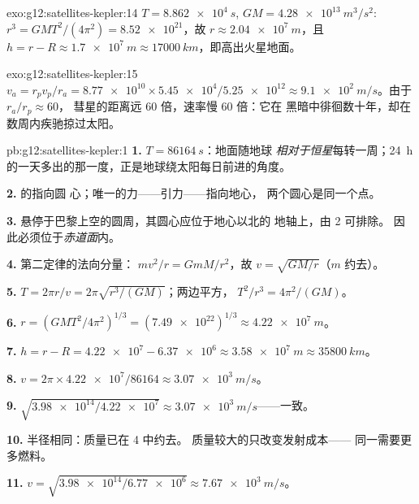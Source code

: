 \begin{solution}{exo:g12:satellites-kepler:14}
$T = \qty{8.862e4}{s}$, $GM = \qty{4.28e13}{m^3/s^2}$:
$r^3 = GMT^2/(4\pi^2) = \num{8.52e21}$，故 $r \approx
\qty{2.04e7}{m}$，且 $h = r - R \approx \qty{1.7e7}{m} \approx
\qty{17000}{km}$，即高出火星地面。
\end{solution}

\begin{solution}{exo:g12:satellites-kepler:15}
$v_a = r_p v_p / r_a = \num{8.77e10} \times \num{5.45e4} /
\num{5.25e12} \approx \qty{9.1e2}{m/s}$。由于 $r_a/r_p \approx 60$，
彗星的距离远 $60$ 倍，速率慢 $60$ 倍：它在
黑暗中徘徊数十年，却在数周内疾驰掠过太阳。
\end{solution}

\begin{solution}{pb:g12:satellites-kepler:1}
\textbf{1.} $T = \qty{86164}{s}$：地面随地球
\emph{相对于恒星}每转一周；\qty{24}{h}
的一天多出的那一度，正是地球绕太阳每日前进的角度。

\textbf{2.} 的指向圆
心；唯一的力——引力——指向地心，
两个圆心是同一个点。

\textbf{3.} 悬停于巴黎上空的圆周，其圆心应位于地心以北的
地轴上，由 2 可排除。
因此必须位于\emph{赤道面}内。

\textbf{4.} 第二定律的法向分量：
$m v^2/r = GmM/r^2$，故 $v = \sqrt{GM/r}$（$m$ 约去）。

\textbf{5.} $T = 2\pi r/v = 2\pi\sqrt{r^3/(GM)}$；两边平方，
$T^2/r^3 = 4\pi^2/(GM)$。

\textbf{6.} $r = \left(GMT^2/4\pi^2\right)^{1/3} =
(\num{7.49e22})^{1/3} \approx \qty{4.22e7}{m}$。

\textbf{7.} $h = r - R = \num{4.22e7} - \num{6.37e6} \approx
\qty{3.58e7}{m} \approx \qty{35800}{km}$。

\textbf{8.} $v = 2\pi \times \num{4.22e7}/\num{86164} \approx
\qty{3.07e3}{m/s}$。

\textbf{9.} $\sqrt{\num{3.98e14}/\num{4.22e7}} \approx
\qty{3.07e3}{m/s}$——一致。

\textbf{10.} 半径相同：质量已在 4 中约去。
质量较大的只改变发射成本——
同一需要更多燃料。

\textbf{11.} $v = \sqrt{\num{3.98e14}/\num{6.77e6}} \approx
\qty{7.67e3}{m/s}$。


\end{solution}
